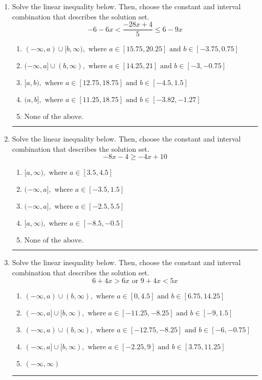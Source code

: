 \documentclass[14pt]{extbook}
\newcommand{\litem}[1]{\item#1\hspace*{-1cm}\rule{\textwidth}{0.4pt}}
\begin{document}
\begin{enumerate}
{\begin{enumerate}[label=\Alph*.]
\end{enumerate} }
\litem{
Solve the linear inequality below. Then, choose the constant and interval combination that describes the solution set.\[ -6 - 6 x < \frac{-28 x + 4}{5} \leq 6 - 9 x \]\begin{enumerate}[label=\Alph*.]
\item \( (-\infty, a) \cup [b, \infty), \text{ where } a \in [15.75, 20.25] \text{ and } b \in [-3.75, 0.75] \)
\item \( (-\infty, a] \cup (b, \infty), \text{ where } a \in [14.25, 21] \text{ and } b \in [-3, -0.75] \)
\item \( [a, b), \text{ where } a \in [12.75, 18.75] \text{ and } b \in [-4.5, 1.5] \)
\item \( (a, b], \text{ where } a \in [11.25, 18.75] \text{ and } b \in [-3.82, -1.27] \)
\item \( \text{None of the above.} \)

\end{enumerate} }
\litem{
Solve the linear inequality below. Then, choose the constant and interval combination that describes the solution set.\[ -8x -4 \geq -4x + 10 \]\begin{enumerate}[label=\Alph*.]
\item \( [a, \infty), \text{ where } a \in [3.5, 4.5] \)
\item \( (-\infty, a], \text{ where } a \in [-3.5, 1.5] \)
\item \( (-\infty, a], \text{ where } a \in [-2.5, 5.5] \)
\item \( [a, \infty), \text{ where } a \in [-8.5, -0.5] \)
\item \( \text{None of the above}. \)

\end{enumerate} }
\litem{
Solve the linear inequality below. Then, choose the constant and interval combination that describes the solution set.\[ 6 + 4 x > 6 x \text{ or } 9 + 4 x < 5 x \]\begin{enumerate}[label=\Alph*.]
\item \( (-\infty, a) \cup (b, \infty), \text{ where } a \in [0, 4.5] \text{ and } b \in [6.75, 14.25] \)
\item \( (-\infty, a] \cup [b, \infty), \text{ where } a \in [-11.25, -8.25] \text{ and } b \in [-9, 1.5] \)
\item \( (-\infty, a) \cup (b, \infty), \text{ where } a \in [-12.75, -8.25] \text{ and } b \in [-6, -0.75] \)
\item \( (-\infty, a] \cup [b, \infty), \text{ where } a \in [-2.25, 9] \text{ and } b \in [3.75, 11.25] \)
\item \( (-\infty, \infty) \)

\end{enumerate} }
\end{enumerate}
\end{document}
